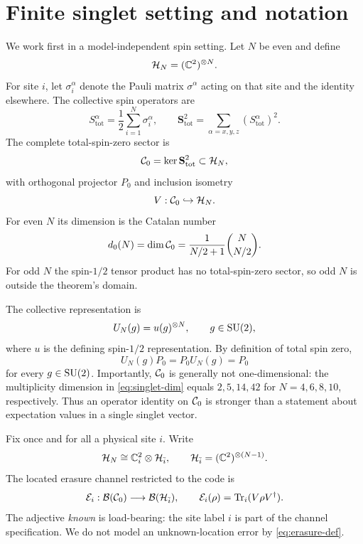 \section{Finite singlet setting and notation}
\label{sec:setting}

We work first in a model-independent spin setting.  Let $N$ be even and define
\begin{equation}
  \mathcal H_N=(\mathbb C^2)^{\otimes N}.
\end{equation}
For site $i$, let $\sigma_i^\alpha$ denote the Pauli matrix $\sigma^\alpha$ acting on that site and the identity elsewhere.  The collective spin operators are
\begin{equation}
  S_{\mathrm{tot}}^\alpha
  =\frac12\sum_{i=1}^N\sigma_i^\alpha,
  \qquad
  \mathbf S_{\mathrm{tot}}^2
  =\sum_{\alpha=x,y,z}(S_{\mathrm{tot}}^\alpha)^2.
\end{equation}
The complete total-spin-zero sector is
\begin{equation}
  \mathcal C_0
  =\ker \mathbf S_{\mathrm{tot}}^2
  \subset\mathcal H_N,
\end{equation}
with orthogonal projector $P_0$ and inclusion isometry
\begin{equation}
  V:\mathcal C_0\hookrightarrow\mathcal H_N.
\end{equation}
For even $N$ its dimension is the Catalan number
\begin{equation}
  d_0(N)=\dim\mathcal C_0
  =\frac{1}{N/2+1}\binom{N}{N/2}.
  \label{eq:singlet-dim}
\end{equation}
For odd $N$ the spin-$1/2$ tensor product has no total-spin-zero sector, so odd $N$ is outside the theorem's domain.

The collective representation is
\begin{equation}
  U_N(g)=u(g)^{\otimes N},\qquad g\in\mathrm{SU}(2),
\end{equation}
where $u$ is the defining spin-$1/2$ representation.  By definition of total spin zero,
\begin{equation}
  U_N(g)P_0=P_0U_N(g)=P_0
  \label{eq:trivial-action}
\end{equation}
for every $g\in\mathrm{SU}(2)$.  Importantly, $\mathcal C_0$ is generally not one-dimensional: the multiplicity dimension in \cref{eq:singlet-dim} equals $2,5,14,42$ for $N=4,6,8,10$, respectively.  Thus an operator identity on $\mathcal C_0$ is stronger than a statement about expectation values in a single singlet vector.

Fix once and for all a physical site $i$.  Write
\begin{equation}
  \mathcal H_N\cong\mathbb C^2_i\otimes\mathcal H_{\bar i},
  \qquad
  \mathcal H_{\bar i}=(\mathbb C^2)^{\otimes(N-1)}.
\end{equation}
The located erasure channel restricted to the code is
\begin{equation}
  \mathcal E_i:\mathcal B(\mathcal C_0)\longrightarrow\mathcal B(\mathcal H_{\bar i}),
  \qquad
  \mathcal E_i(\rho)=\operatorname{Tr}_i(V\rho V^\dagger).
  \label{eq:erasure-def}
\end{equation}
The adjective \emph{known} is load-bearing: the site label $i$ is part of the channel specification.  We do not model an unknown-location error by \cref{eq:erasure-def}.

